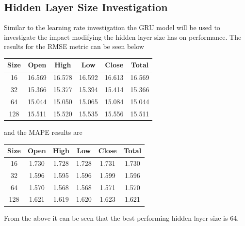 \documentclass[10pt,twocolumn,letterpaper]{article}
\begin{document}
\subsection{Hidden Layer Size Investigation}
Similar to the learning rate investigation the GRU model will be used to investigate the 
impact modifying the hidden layer size has on performance. The results for the RMSE metric can be seen below
\begin{center}
   \begin{tabular}{||c c c c c c||} 
    \hline
    Size & Open & High & Low & Close & Total\\ [0.5ex] 
    \hline\hline
    16  & 16.569& 16.578& 16.592& 16.613& 16.569 \\
    \hline
    32  & 15.366& 15.377& 15.394& 15.414& 15.366 \\
    \hline
    64  & 15.044& 15.050& 15.065& 15.084& 15.044 \\
    \hline
    128  & 15.511& 15.520& 15.535& 15.556& 15.511 \\
    \hline
   \end{tabular}
\end{center}
and the MAPE results are   
\begin{center}
   \begin{tabular}{||c c c c c c||} 
    \hline
    Size & Open & High & Low & Close & Total\\ [0.5ex] 
    \hline\hline
    16   & 1.730& 1.728& 1.728& 1.731& 1.730 \\
    \hline
    32  & 1.596& 1.595& 1.596& 1.599& 1.596 \\
    \hline
    64 & 1.570& 1.568& 1.568& 1.571& 1.570 \\
    \hline
    128  & 1.621& 1.619& 1.620& 1.623& 1.621 \\
    \hline
   \end{tabular}
\end{center}
From the above it can be seen that the best performing hidden layer size is 64.
\end{document}
